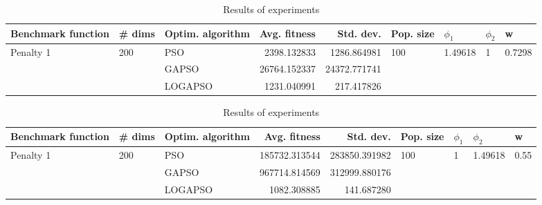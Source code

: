 \documentclass{article}
\begin{document}
\begin{table}
\centering
\caption{Results of experiments}
\begin{tabular}{lllrrllll}
\toprule
        Benchmark function &              \# dims & Optim. algorithm &  Avg. fitness &    Std. dev. &            Pop. size &               $\phi_{1}$ &         $\phi_{2}$ &                       w \\
\midrule
\multirow{3}{*}{Penalty 1} & \multirow{3}{*}{200} &              PSO &   2398.132833 &  1286.864981 & \multirow{3}{*}{100} & \multirow{3}{*}{1.49618} & \multirow{3}{*}{1} & \multirow{3}{*}{0.7298} \\
                           &                      &            GAPSO &  26764.152337 & 24372.771741 &                      &                          &                    &                         \\
                           &                      &          LOGAPSO &   1231.040991 &   217.417826 &                      &                          &                    &                         \\
\bottomrule
\end{tabular}
\end{table}
\begin{table}
\centering
\caption{Results of experiments}
\begin{tabular}{lllrrllll}
\toprule
        Benchmark function &              \# dims & Optim. algorithm &  Avg. fitness &     Std. dev. &            Pop. size &         $\phi_{1}$ &               $\phi_{2}$ &                     w \\
\midrule
\multirow{3}{*}{Penalty 1} & \multirow{3}{*}{200} &              PSO & 185732.313544 & 283850.391982 & \multirow{3}{*}{100} & \multirow{3}{*}{1} & \multirow{3}{*}{1.49618} & \multirow{3}{*}{0.55} \\
                           &                      &            GAPSO & 967714.814569 & 312999.880176 &                      &                    &                          &                       \\
                           &                      &          LOGAPSO &   1082.308885 &    141.687280 &                      &                    &                          &                       \\
\bottomrule
\end{tabular}
\end{table}
\end{document}
